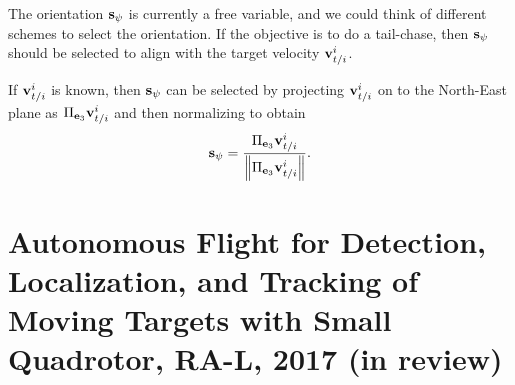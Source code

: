 The orientation $\mathbf{s}_\psi$ is currently a free variable, and we could think of different schemes to select the orientation.  If the objective is to do a tail-chase, then $\mathbf{s}_\psi$ should be selected to align with the target velocity $\mathbf{v}_{t/i}^i$. 

If $\mathbf{v}_{t/i}^i$ is known, then $\mathbf{s}_\psi$ can be selected by projecting $\mathbf{v}_{t/i}^i$ on to the North-East plane as $\Pi_{\mathbf{e}_3}\mathbf{v}_{t/i}^i$ and then normalizing to obtain
\begin{equation}\label{eq:tracking_heading_vector}
\sbf_{\psi} = \frac{\Pi_{\ebf_3}\vbf_{t/i}^i}{\norm{\Pi_{\ebf_3}\vbf_{t/i}^i}}.
\end{equation}



\section{Autonomous Flight for Detection, Localization, and Tracking of Moving Targets with Small Quadrotor, RA-L, 2017 (in review)}




